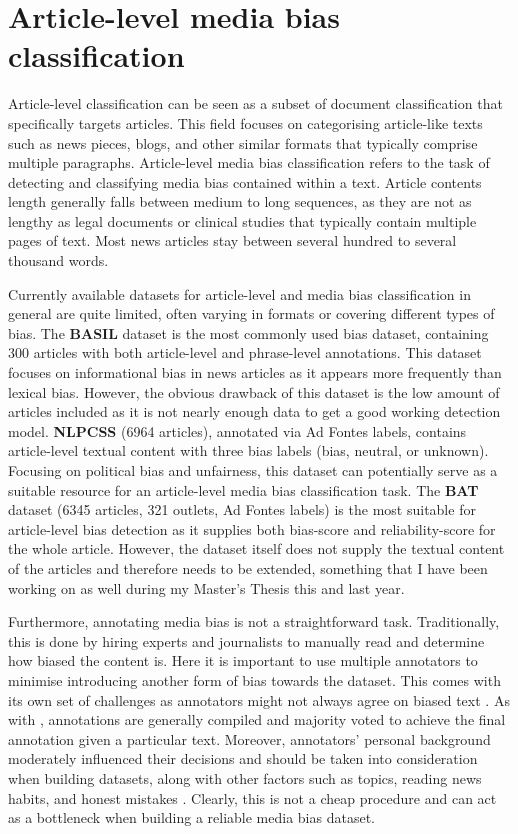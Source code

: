 \section{Article-level media bias classification}

Article-level classification can be seen as a subset of document classification that specifically targets articles. This field focuses on categorising article-like texts such as news pieces, blogs, and other similar formats that typically comprise multiple paragraphs. Article-level media bias classification refers to the task of detecting and classifying media bias contained within a text. Article contents length generally falls between medium to long sequences, as they are not as lengthy as legal documents or clinical studies that typically contain multiple pages of text. Most news articles stay between several hundred to several thousand words.

Currently available datasets for article-level and media bias classification in general are quite limited, often varying in formats or covering different types of bias. The \textbf{BASIL} dataset \cite{fan-2019-basil} is the most commonly used bias dataset, containing 300 articles with both article-level and phrase-level annotations. This dataset focuses on informational bias in news articles as it appears more frequently than lexical bias. However, the obvious drawback of this dataset is the low amount of articles included as it is not nearly enough data to get a good working detection model. \textbf{NLPCSS} \cite{chen-2020-nlpcss} (6964 articles), annotated via Ad Fontes labels, contains article-level textual content with three bias labels (bias, neutral, or unknown). Focusing on political bias and unfairness, this dataset can potentially serve as a suitable resource for an article-level media bias classification task. The \textbf{BAT} \cite{spinde-2023-bat} dataset (6345 articles, 321 outlets, Ad Fontes labels) is the most suitable for article-level bias detection as it supplies both bias-score and reliability-score for the whole article. However, the dataset itself does not supply the textual content of the articles and therefore needs to be extended, something that I have been working on as well during my Master's Thesis this and last year.

Furthermore, annotating media bias is not a straightforward task. Traditionally, this is done by hiring experts and journalists to manually read and determine how biased the content is. Here it is important to use multiple annotators to minimise introducing another form of bias towards the dataset. This comes with its own set of challenges as annotators might not always agree on biased text \cite{lim-2018-understanding}. As with \cite{spinde-2021-babe}, annotations are generally compiled and majority voted to achieve the final annotation given a particular text. Moreover, annotators' personal background moderately influenced their decisions and should be taken into consideration when building datasets, along with other factors such as topics, reading news habits, and honest mistakes \cite{spinde-2021-bias-words}. Clearly, this is not a cheap procedure and can act as a bottleneck when building a reliable media bias dataset.

